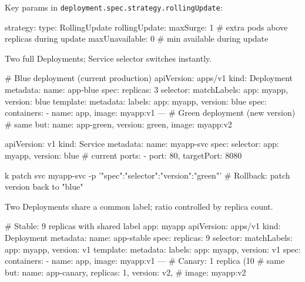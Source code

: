 \begin{tcbitemize}[
  raster columns=2, raster equal height=rows,
  blanker, cheat subtitle
]

\tcbitem


  {\sffamily\small Key params in \texttt{deployment.spec.strategy.rollingUpdate}:}
  \begin{cheatcodebash}
strategy:
  type: RollingUpdate
  rollingUpdate:
    maxSurge: 1          # extra pods above replicas during update
    maxUnavailable: 0    # min available during update
  \end{cheatcodebash}


  {\sffamily\small Two full Deployments; Service selector switches instantly.}
  \begin{cheatcodebash}
# Blue deployment (current production)
apiVersion: apps/v1
kind: Deployment
metadata: {name: app-blue}
spec:
  replicas: 3
  selector: {matchLabels: {app: myapp, version: blue}}
  template:
    metadata: {labels: {app: myapp, version: blue}}
    spec:
      containers:
      - {name: app, image: myapp:v1}
---
# Green deployment (new version)
# same but: name: app-green, version: green, image: myapp:v2
  \end{cheatcodebash}

  \begin{cheatcodebash}
apiVersion: v1
kind: Service
metadata: {name: myapp-svc}
spec:
  selector: {app: myapp, version: blue}  # current
  ports:
  - {port: 80, targetPort: 8080}
  \end{cheatcodebash}

  \begin{cheatcodebashbold}
k patch svc myapp-svc -p '{"spec":{"selector":{"version":"green"}}}'
# Rollback: patch version back to "blue"
  \end{cheatcodebashbold}


\tcbitem


  {\sffamily\small Two Deployments share a common label; ratio controlled by replica count.}
  \begin{cheatcodebash}
# Stable: 9 replicas with shared label app: myapp
apiVersion: apps/v1
kind: Deployment
metadata: {name: app-stable}
spec:
  replicas: 9
  selector: {matchLabels: {app: myapp, version: v1}}
  template:
    metadata: {labels: {app: myapp, version: v1}}
    spec:
      containers:
      - {name: app, image: myapp:v1}
---
# Canary: 1 replica (10%
# same but: name: app-canary, replicas: 1, version: v2,
#           image: myapp:v2
  \end{cheatcodebash}


\end{tcbitemize}
